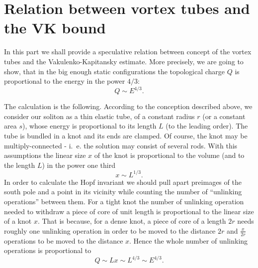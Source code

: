 \documentclass[a4paper,12pt]{article}
\begin{document}
\section{Relation between vortex tubes and the VK bound}
        In this part we shall provide a speculative relation
        between concept of the vortex tubes and the Vakulenko-Kapitansky
        estimate. 
        More precisely, we are going to show, that in the big
        enough static configurations the topological charge 
    $ Q $
        is proportional to the energy in the power 
    $ 4/3 $:
\begin{equation}
\label{QE}
    Q \sim E^{4/3} .
\end{equation}

	The calculation is the following. According to the conception
	described above, we consider
	our soliton as a thin elastic tube, of a constant radius
    $ r $
	(or a constant area $ s $),
	whose energy is proportional to its length
    $ L $ (to the leading order).
	The tube is bundled in a knot and its ends are clamped.
	Of course, the knot may be multiply-connected - i.~e. the solution
	may consist of several rods. 
	With this assumptions the linear size 
    $ x $
	of the knot is proportional to the volume (and to the length
    $ L $)
	in the power one third
$$ x \sim L^{1/3} . $$
	In order to calculate the Hopf invariant
	we should pull apart preimages of the south 
	pole and a point in its vicinity while 
	counting the number of ``unlinking operations'' between them.
	For a tight knot the number of unlinking operation needed
	to withdraw a piece of core of unit length is proportional to the
	linear size of a knot 
    $ x $. 
	That is because, for a dense knot,
	a piece of core of a length
    $ 2r $
	needs roughly one unlinking operation in order to be moved to
	the distance
    $ 2r $ and
    $ \frac{x}{2r} $
	operations to be moved to the distance
    $ x $.
	Hence the whole number of unlinking operations is proportional to
\begin{equation}
\label{HH}
	Q \sim L x \sim L^{4/3} \sim E^{4/3} .
\end{equation}
\end{document}

